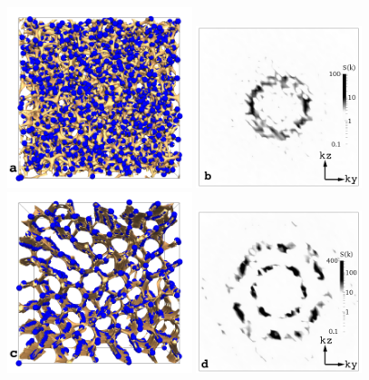 \documentclass[12pt]{article}
\begin{document}
\begin{figure}
\begin{center}
\includegraphics[width=0.48\textwidth]{col_disc_x_run1267.png}
\includegraphics[width=0.43\textwidth]{sq_x_run1267.png}\\
\includegraphics[width=0.48\textwidth]{col_disc_x_run1341.png}
\includegraphics[width=0.43\textwidth]{sq_x_run1341.png}

\end{center}
\end{figure}
\end{document}
